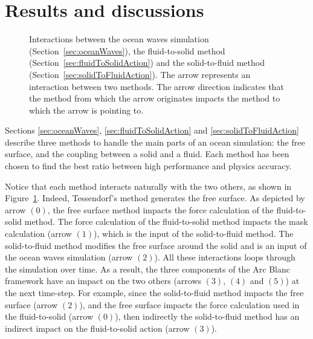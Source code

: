 \documentclass[final]{jcgt}
\def\framework{the Arc Blanc framework\xspace}
\def\ie{\emph{i.e.}\xspace}
\begin{document}
\section{Results and discussions}
\label{sec:results_and_discussions}


\begin{figure}
	\centering
	
	\caption{Interactions between the ocean waves simulation (Section~\ref{sec:oceanWaves}), the fluid-to-solid method (Section~\ref{sec:fluidToSolidAction}) and the solid-to-fluid method (Section~\ref{sec:solidToFluidAction}).
		The arrow represents an interaction between two methods.
		The arrow direction indicates that the method from which the arrow originates impacts the method to which the arrow is pointing to.}
	\label{fig:interactionMethods}
\end{figure}

Sections \ref{sec:oceanWaves}, \ref{sec:fluidToSolidAction} and \ref{sec:solidToFluidAction} describe three methods to handle the main parts of an ocean simulation: the free surface, and the coupling between a solid and a fluid.
Each method has been chosen to find the best ratio between high performance and physics accuracy.

Notice that each method interacts naturally with the two others, as shown in Figure~\ref{fig:interactionMethods}.
Indeed, Tessendorf's method generates the free surface.
As depicted by arrow $(0)$, the free surface method impacts the force calculation of the fluid-to-solid method.
The force calculation of the fluid-to-solid method impacts the mask calculation (arrow $(1)$), which is the input of the solid-to-fluid method.
The solid-to-fluid method modifies the free surface around the solid and is an input of the ocean waves simulation (arrow $(2)$).
All these interactions loops through the simulation over time. 
As a result, the three components of \framework have an impact on the two others (arrows $(3)$, $(4)$ and $(5)$) at the next time-step.
For example, since the solid-to-fluid method impacts the free surface (arrow $(2)$), and the free surface impacts the force calculation used in the fluid-to-solid (arrow $(0)$), then indirectly the solid-to-fluid method has an indirect impact on the fluid-to-solid action (arrow $(3)$).
\end{document}
